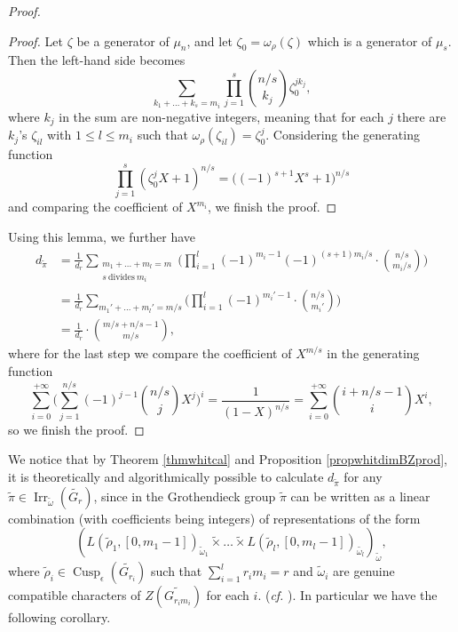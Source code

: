 \documentclass{amsart}
\numberwithin{equation}{section}
\newcommand{\mrirr}{\operatorname{Irr}}
\newcommand{\mrcusp}{\operatorname{Cusp}}
\newcommand{\wt}[1]{\widetilde{#1}}
\begin{document}
\begin{proof}
			\begin{proof}
				Let $\zeta$ be a generator of $\mu_{n}$, and let $\zeta_{0}=\omega_{\rho}(\zeta)$ which is a generator of $\mu_{s}$. Then the left-hand side becomes
				$$\sum_{k_{1}+\dots+k_{s}=m_{i}}\prod_{j=1}^{s}\binom{n/s}{k_{j}}\zeta_{0}^{jk_{j}},$$
				where $k_{j}$ in the sum are non-negative integers, meaning that for each $j$ there are $k_{j}$'s $\zeta_{il}$ with $1\leq l\leq m_{i}$ such that $\omega_{\rho}(\zeta_{il})=\zeta_{0}^{j}$.
				Considering the generating function
				$$\prod_{j=1}^{s}(\zeta_{0}^{j}X+1)^{n/s}=\big((-1)^{s+1}X^{s}+1\big)^{n/s}$$
				and comparing the coefficient of $X^{m_{i}}$, we finish the proof.
			\end{proof}
			Using this lemma, we further have
			\begin{align*}d_{\wt{\pi}}&=\frac{1}{d_{r}}\sum_{\substack{m_{1}+\dots+m_{l}=m\\ s\ \text{divides}\ m_{i}}}\bigg(\prod_{i=1}^{l}(-1)^{m_{i}-1}(-1)^{(s+1)m_{i}/s}\cdot\binom{n/s}{m_{i}/s}\bigg)\\
				&=\frac{1}{d_{r}}\sum_{m_{1}'+\dots+m_{l}'=m/s}\bigg(\prod_{i=1}^{l}(-1)^{m_{i}'-1}\cdot\binom{n/s}{m_{i}'}\bigg)\\
				&=\frac{1}{d_{r}}\cdot\binom{m/s+n/s-1}{m/s},
			\end{align*}
			where for the last step we compare the coefficient of $X^{m/s}$ in the generating function
			$$\sum_{i=0}^{+\infty}\big(\sum_{j=1}^{n/s}(-1)^{j-1}\binom{n/s}{j}X^{j}\big)^{i}=\frac{1}{(1-X)^{n/s}}=\sum_{i=0}^{+\infty}\binom{i+n/s-1}{i}X^{i},$$
			so we finish the proof.
			
		\end{proof}
		
		We notice that by Theorem \ref{thmwhitcal} and Proposition \ref{propwhitdimBZprod}, it is theoretically and algorithmically possible to calculate $d_{\wt{\pi}}$ for any $\wt{\pi}\in\mrirr_{\wt{\omega}}(\wt{G_{r}})$, since in the Grothendieck group $\wt{\pi}$ can be written as a linear combination (with coefficients being integers) of representations of the form
		$$(L(\wt{\rho}_{1},[0,m_{1}-1])_{\wt{\omega}_{1}}\wt{\times}\dots\wt{\times} L(\wt{\rho}_{l},[0,m_{l}-1])_{\wt{\omega_{l}}})_{\wt{\omega}},$$
		where $\wt{\rho}_{i}\in\mrcusp_{\epsilon}(\wt{G_{r_{i}}})$ such that $\sum_{i=1}^{l}r_{i}m_{i}=r$ and $\wt{\omega}_{i}$ are genuine compatible characters of $Z(\wt{G_{r_{i}m_{i}}})$ for each $i$.
		(\emph{cf.} \cite{kaplan2022classification}). In particular we have the following corollary.
		
\end{document}
